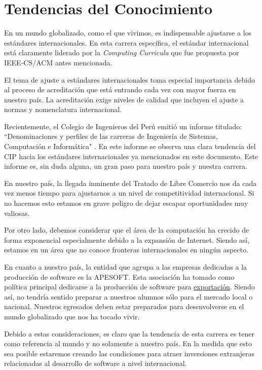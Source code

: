 \section{Tendencias del Conocimiento}\label{sec:cs-tendencias-del-conocimiento}
En un mundo globalizado, como el que vivimos, es indispensable ajustarse a los estándares internacionales. En esta carrera específica, el estándar internacional está claramente liderado por la \textit{Computing Curricula} que fue propuesta por IEEE-CS/ACM antes mencionada.

El tema de ajuste a estándares internacionales toma especial importancia debido al proceso de acreditación que está entrando cada vez con mayor fuerza en nuestro país. La acreditación exige niveles de calidad que incluyen el ajuste a normas y nomenclatura internacional.

Recientemente, el Colegio de Ingenieros del Perú emitió un informe titulado: ``Denominaciones y perfiles de las carreras de Ingeniería de Sistemas, Computación e Informática" \cite{CIPInforme2006}. En este informe se observa una clara tendencia del CIP hacia los estándares internacionales ya mencionados en este documento. Este informe es, sin duda alguna, un gran paso para nuestro país y nuestra carrera.

En nuestro país, la llegada inminente del Tratado de Libre Comercio nos da cada vez menos tiempo para ajustarnos a un nivel de competitividad internacional. Si no hacemos esto estamos en grave peligro de dejar escapar oportunidades muy valiosas. 

Por otro lado, debemos considerar que el área de la computación ha crecido de forma exponencial especialmente debido a la expansión de Internet. Siendo así, estamos en un área que no conoce fronteras internacionales en ningún aspecto.

En cuanto a nuestro país, la entidad que agrupa a las empresas dedicadas a la producción de software es la \ac{APESOFT}. Esta asociación ha tomado como política principal dedicarse a la producción de software para \underline{exportación}. Siendo así, no tendría sentido preparar a nuestros alumnos sólo para el mercado local o nacional. Nuestros egresados deben estar preparados para desenvolverse en el mundo globalizado que nos ha tocado vivir.

Debido a estas consideraciones, es claro que la tendencia de esta carrera es tener como referencia al mundo y no solamente a nuestro país. En la medida que esto sea posible estaremos creando las condiciones para atraer inversiones extranjeras relacionadas al desarrollo de software a nivel internacional.
